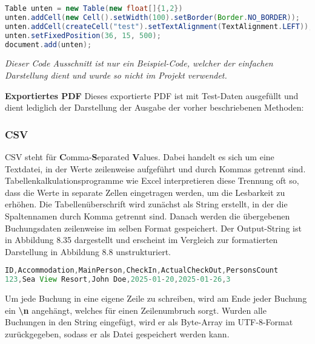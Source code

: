 \begin{lstlisting}[language=Java, caption={Code-Ausschnitt: PDF-Footer.}]
Table unten = new Table(new float[]{1,2})
unten.addCell(new Cell().setWidth(100).setBorder(Border.NO_BORDER));
unten.addCell(createCell("test").setTextAlignment(TextAlignment.LEFT));
unten.setFixedPosition(36, 15, 500);
document.add(unten);
\end{lstlisting}
	
	\noindent \textit{Dieser Code Ausschnitt ist nur ein Beispiel-Code, welcher der einfachen Darstellung dient und wurde so nicht im Projekt verwendet.}
	
	\newpage
	\noindent \textbf{Exportiertes PDF}\vspace{3mm}\newline
	Dieses exportierte PDF ist mit Test-Daten ausgefüllt und dient lediglich der Darstellung der Ausgabe der vorher beschriebenen Methoden: 
	
	
	
	\subsubsection{CSV}
    CSV steht für \textbf{C}omma-\textbf{S}eparated \textbf{V}alues. Dabei handelt es sich um eine Textdatei, in der Werte zeilenweise aufgeführt und durch Kommas getrennt sind. Tabellenkalkulationsprogramme wie Excel interpretieren diese Trennung oft so, dass die Werte in separate Zellen eingetragen werden, um die Lesbarkeit zu erhöhen. Die Tabellenüberschrift wird zunächst als String erstellt, in der die Spaltennamen durch Komma  getrennt sind. Danach werden die übergebenen Buchungsdaten zeilenweise im selben Format gespeichert. Der Output-String ist in Abbildung 8.35 dargestellt und erscheint im Vergleich zur formatierten Darstellung in Abbildung 8.8 unstrukturiert.
	
\begin{lstlisting}[language=Java, caption={Code-Ausschnitt: String Form eines CSV.}]
ID,Accommodation,MainPerson,CheckIn,ActualCheckOut,PersonsCount
123,Sea View Resort,John Doe,2025-01-20,2025-01-26,3
\end{lstlisting}

	
	\noindent Um jede Buchung in eine eigene Zeile zu schreiben, wird am Ende jeder Buchung ein \textbf{\textbackslash n} angehängt, welches für einen Zeilenumbruch sorgt. Wurden alle Buchungen in den String eingefügt, wird er als Byte-Array im UTF-8-Format zurückgegeben, sodass er als Datei gespeichert werden kann.
	
